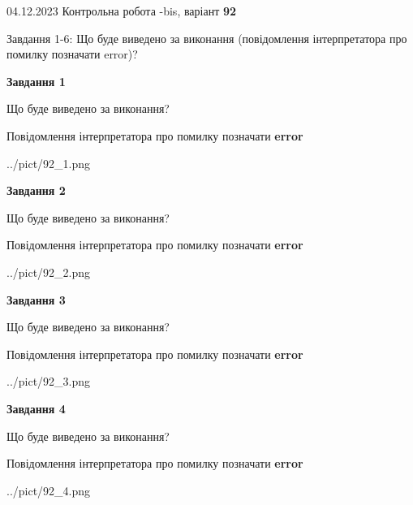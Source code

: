 \documentclass[12pt, ukrainian]{article}
\begin{document}
{{04.12.2023 Контрольна робота -bis, варіант  \No \textbf { 92 }\par}}
{

Завдання 1-6: Що буде виведено за виконання (повідомлення інтерпретатора про помилку позначати error)?


{\begin {center}\textbf{Завдання 1}\end {center}}\par
Що буде виведено за виконання? \par
Повідомлення інтерпретатора про помилку позначати \textbf{error}

\begin{center}
	{../pict/92_1.png}
\end{center}
\newpage

{\begin {center}\textbf{Завдання 2}\end {center}}\par
Що буде виведено за виконання? \par
Повідомлення інтерпретатора про помилку позначати \textbf{error}

\begin{center}
	{../pict/92_2.png}
\end{center}
\newpage

{\begin {center}\textbf{Завдання 3}\end {center}}\par
Що буде виведено за виконання? \par
Повідомлення інтерпретатора про помилку позначати \textbf{error}

\begin{center}
	{../pict/92_3.png}
\end{center}
\newpage

{\begin {center}\textbf{Завдання 4}\end {center}}\par
Що буде виведено за виконання? \par
Повідомлення інтерпретатора про помилку позначати \textbf{error}

\begin{center}
	{../pict/92_4.png}
\end{center}
\newpage

}
\end{document}
